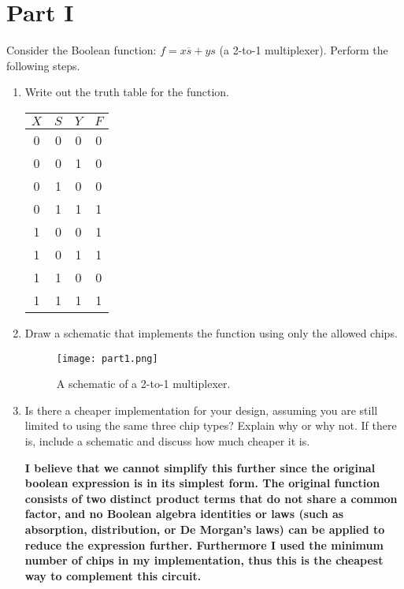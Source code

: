 \documentclass{article}
\begin{document}
\newpage
\section*{Part I}

Consider the Boolean function: $f = x\overline{s}+ys$ (a 2-to-1 multiplexer).
Perform the following steps.

\begin{enumerate}

\item Write out the truth table for the function.
\begin{center}
\begin{tabular}{ccc|c}
  $X$ & $S$ & $Y$ & $F$ \\
  \hline
  0 & 0 & 0 & 0 \\
  0 & 0 & 1 & 0 \\
  0 & 1 & 0 & 0 \\
  0 & 1 & 1 & 1 \\
  1 & 0 & 0 & 1 \\
  1 & 0 & 1 & 1 \\
  1 & 1 & 0 & 0 \\
  1 & 1 & 1 & 1 \\
\end{tabular}
\end{center}


\item Draw a schematic that implements the function using only the allowed chips.

\begin{figure}[h]
  \centering
  \texttt{[image: part1.png]}
  \caption{A schematic of a 2-to-1 multiplexer.}
  \label{fig:part1}
\end{figure}

\item Is there a cheaper implementation for your design, assuming you are still limited to using the same three chip types?
    Explain why or why not.
    If there is, include a schematic and discuss how much cheaper it is.

\begin{center}
  \textbf{I believe that we cannot simplify this further since the original boolean expression is in its simplest form. The original function consists of two distinct product terms that do not share a common factor, and no Boolean algebra identities or laws (such as absorption, distribution, or De Morgan's laws) can be applied to reduce the expression further. Furthermore I  used the minimum number of chips in my implementation, thus this is the cheapest way to complement this circuit.}
\end{center}

\end{enumerate}
\end{document}
